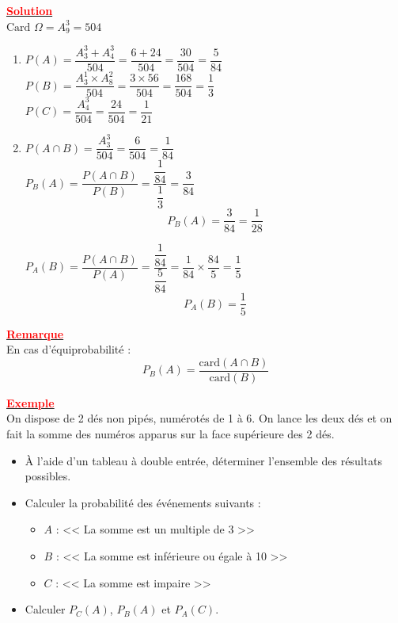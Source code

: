 \documentclass[12pt,a4paper]{article}
\begin{document}
\underline{\textbf{\textcolor{red}{Solution}}}\\

$\text{Card } \Omega = A_9^3 = 504$
\begin{enumerate}
\item $P(A) = \dfrac{A_3^3 + A_4^3}{504} = \dfrac{6 + 24}{504} = \dfrac{30}{504} = \dfrac{5}{84}$ \\

$P(B) = \dfrac{A_3^1 \times A_8^2}{504} = \dfrac{3 \times 56}{504} = \dfrac{168}{504} = \dfrac{1}{3}$ \\

$P(C) = \dfrac{A_4^3}{504} = \dfrac{24}{504} = \dfrac{1}{21}$

\item $P(A \cap B) = \dfrac{A_3^3}{504} = \dfrac{6}{504} = \dfrac{1}{84}$ \\

$P_B(A) = \dfrac{P(A \cap B)}{P(B)} = \dfrac{\dfrac{1}{84}}{\dfrac{1}{3}} = \dfrac{3}{84}$ \\
\begin{equation*}
    \boxed{P_B(A) = \dfrac{3}{84} = \dfrac{1}{28}}
\end{equation*}

$P_A(B) = \dfrac{P(A \cap B)}{P(A)} = \dfrac{\dfrac{1}{84}}{\dfrac{5}{84}} = \dfrac{1}{84} \times \dfrac{84}{5} = \dfrac{1}{5}$ \\
\begin{equation*}
    \boxed{P_A(B) = \dfrac{1}{5}}
\end{equation*}

\end{enumerate}

\underline{\textbf{\textcolor{red}{Remarque}}}\\
En cas d'équiprobabilité :
\begin{equation*}
    \boxed{P_B(A) = \frac{\text{card}(A \cap B)}{\text{card}(B)}}
\end{equation*}

\underline{\textbf{\textcolor{red}{Exemple}}}\\
On dispose de 2 dés non pipés, numérotés de 1 à 6. On lance les deux dés et on fait la somme des numéros apparus sur la face supérieure des 2 dés.

\begin{itemize}
    \item À l'aide d'un tableau à double entrée, déterminer l'ensemble des résultats possibles.
    \item Calculer la probabilité des événements suivants :
    \begin{itemize}
        \item $A$ : << La somme est un multiple de 3 >>
        \item $B$ : << La somme est inférieure ou égale à 10 >>
        \item $C$ : << La somme est impaire >>
    \end{itemize}
    \item Calculer $P_C(A)$, $P_B(A)$ et $P_A(C)$.
\end{itemize}
\end{document}

